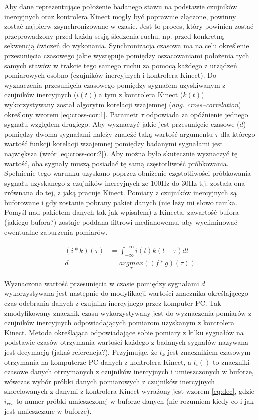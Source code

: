 Aby dane reprezentujące położenie badanego stawu na podstawie czujników inercyjnych oraz kontrolera Kinect mogły być poprawnie złączone, powinny zostać najpierw zsynchronizowane w czasie. Jest to proces, który powinien zostać przeprowadzony przed każdą sesją śledzenia ruchu, np. przed konkretną sekwencją ćwiczeń do wykonania. Synchronizacja czasowa ma na celu określenie przesunięcia czasowego jakie występuje pomiędzy oszacowaniami położenia tych samych stawów w trakcie tego samego ruchu za pomocą każdego z urządzeń pomiarowych osobno (czujników inercyjnych i kontrolera Kinect). Do wyznaczenia przesunięcia czasowego pomiędzy sygnałem uzyskiwanym z czujników inercyjnych ($i(t)$) a tym z kontrolera Kinect ($k(t)$) wykorzystywany został algorytm korelacji wzajemnej (\emph{ang. cross--correlation}) określony wzorem \eqref{eq:cross-cor:1}. Parametr $\tau$ odpowiada za opóźnienie jednego sygnału względem drugiego. Aby wyznaczyć jakie jest przesunięcie czasowe ($d$) pomiędzy dwoma sygnałami należy znaleźć taką wartość argumentu $\tau$ dla którego wartość funkcji korelacji wzajemnej pomiędzy badanymi sygnałami jest największa (wzór \eqref{eq:cross-cor:2}). Aby można było skutecznie wyznaczyć tę wartość, oba sygnały muszą posiadać tę samą częstotliwość próbkowania. Spełnienie tego warunku uzyskano poprzez obniżenie częstotliwości próbkowania sygnału uzyskanego z czujników inercyjnych ze 100Hz  do 30Hz t.j. została ona zrównana do tej, z jaką pracuje Kinect. Pomiary z czujników inercyjnych są buforowane i gdy zostanie pobrany pakiet danych (nie leży mi słowo ramka. Pomyśl nad pakietem danych tak jak wpisałem) z Kinecta, zawartość bufora (jakiego bufora?) zostaje poddana filtrowi medianowemu, aby wyeliminować ewentualne zaburzenia pomiarów. 

\begin{subequations}
\begin{align}
(i \ast k)(\tau) &= \int_{-\infty}^{+\infty}i(t)k(t+\tau)dt\label{eq:cross-cor:1}\\
d &= \underset{\tau}{argmax}((f \ast g)(\tau))\label{eq:cross-cor:2}
\end{align}
\label{eq:cross-cor}
\end{subequations}

Wyznaczona wartość przesunięcia w czasie pomiędzy sygnałami $d$ wykorzystywana jest następnie do modyfikacji wartości znacznika określającego czas odebrania danych z czujnika inercyjnego przez komputer PC. Tak zmodyfikowany znacznik czasu wykorzystywany jest do wyznaczenia pomiarów z czujników inercyjnych odpowiadających pomiarom uzyskanym z kontrolera Kinect. Metoda określająca odpowiadające sobie pomiary z kilku sygnałów na podstawie czasów otrzymania wartości każdego z badanych sygnałów nazywana jest decymacją (jakaś referencja?). Przyjmując, że $t_k$ jest znacznikiem czasowym otrzymania na komputerze PC danych z kontrolera Kinect, a $t_i()$ to znaczniki czasowe danych  otrzymanych z czujników inercyjnych i umieszczonych w buforze, wówczas wybór próbki danych pomiarowych z czujników inercyjnych skorelowanych z danymi z kontrolera Kinect wyrażony jest wzorem \eqref{eq:dec}, gdzie $i_{res}$ to numer próbki umieszczonej w buforze danych (nie rozumiem kiedy co i jak jest umieszczane w buforze).

